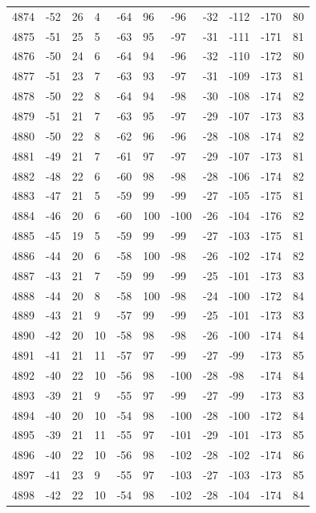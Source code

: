 \begin{table}[H]
\begin{tabular}{lllllllllll}
4874 & -52 & 26 & 4 & -64 & 96 & -96 & -32 & -112 & -170 & 80 \\
4875 & -51 & 25 & 5 & -63 & 95 & -97 & -31 & -111 & -171 & 81 \\
4876 & -50 & 24 & 6 & -64 & 94 & -96 & -32 & -110 & -172 & 80 \\
4877 & -51 & 23 & 7 & -63 & 93 & -97 & -31 & -109 & -173 & 81 \\
4878 & -50 & 22 & 8 & -64 & 94 & -98 & -30 & -108 & -174 & 82 \\
4879 & -51 & 21 & 7 & -63 & 95 & -97 & -29 & -107 & -173 & 83 \\
4880 & -50 & 22 & 8 & -62 & 96 & -96 & -28 & -108 & -174 & 82 \\
4881 & -49 & 21 & 7 & -61 & 97 & -97 & -29 & -107 & -173 & 81 \\
4882 & -48 & 22 & 6 & -60 & 98 & -98 & -28 & -106 & -174 & 82 \\
4883 & -47 & 21 & 5 & -59 & 99 & -99 & -27 & -105 & -175 & 81 \\
4884 & -46 & 20 & 6 & -60 & 100 & -100 & -26 & -104 & -176 & 82 \\
4885 & -45 & 19 & 5 & -59 & 99 & -99 & -27 & -103 & -175 & 81 \\
4886 & -44 & 20 & 6 & -58 & 100 & -98 & -26 & -102 & -174 & 82 \\
4887 & -43 & 21 & 7 & -59 & 99 & -99 & -25 & -101 & -173 & 83 \\
4888 & -44 & 20 & 8 & -58 & 100 & -98 & -24 & -100 & -172 & 84 \\
4889 & -43 & 21 & 9 & -57 & 99 & -99 & -25 & -101 & -173 & 83 \\
4890 & -42 & 20 & 10 & -58 & 98 & -98 & -26 & -100 & -174 & 84 \\
4891 & -41 & 21 & 11 & -57 & 97 & -99 & -27 & -99 & -173 & 85 \\
4892 & -40 & 22 & 10 & -56 & 98 & -100 & -28 & -98 & -174 & 84 \\
4893 & -39 & 21 & 9 & -55 & 97 & -99 & -27 & -99 & -173 & 83 \\
4894 & -40 & 20 & 10 & -54 & 98 & -100 & -28 & -100 & -172 & 84 \\
4895 & -39 & 21 & 11 & -55 & 97 & -101 & -29 & -101 & -173 & 85 \\
4896 & -40 & 22 & 10 & -56 & 98 & -102 & -28 & -102 & -174 & 86 \\
4897 & -41 & 23 & 9 & -55 & 97 & -103 & -27 & -103 & -173 & 85 \\
4898 & -42 & 22 & 10 & -54 & 98 & -102 & -28 & -104 & -174 & 84 \\

\end{tabular}
\end{table}
